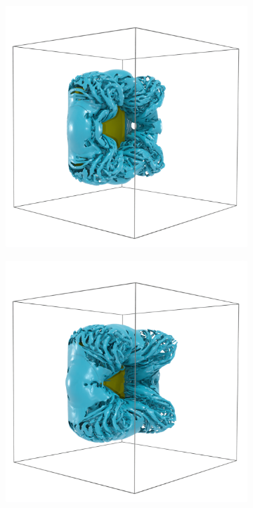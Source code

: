 \documentclass[preprint,12pt]{elsarticle}
\begin{document}
\begin{figure}
\begin{subfigure}{.33\textwidth}
    \end{subfigure}%
    \begin{subfigure}{.33\textwidth}
        \centering
        \includegraphics[width=\textwidth]{tex/fig/disk_high_re_6.png}
    \end{subfigure}%
    \begin{subfigure}{.33\textwidth}
        \centering
        \includegraphics[width=\textwidth]{tex/fig/disk_high_re_7.png}

\end{subfigure}
\end{figure}
\end{document}
